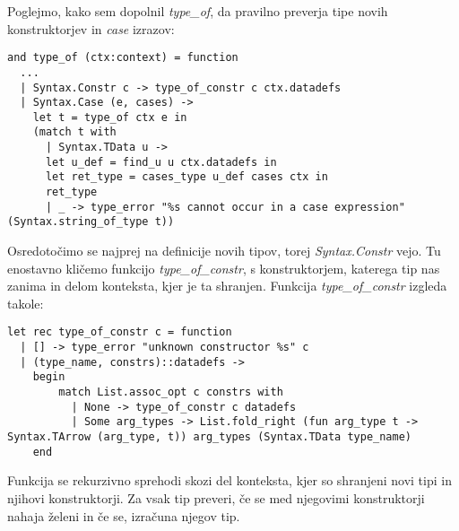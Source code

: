 \documentclass[12pt,a4paper,openany]{book}
\begin{document}
Poglejmo, kako sem dopolnil \emph{type\_of}, da pravilno preverja tipe novih konstruktorjev in \emph{case} izrazov:
\begin{lstlisting}
and type_of (ctx:context) = function
  ...
  | Syntax.Constr c -> type_of_constr c ctx.datadefs
  | Syntax.Case (e, cases) -> 
    let t = type_of ctx e in
    (match t with
      | Syntax.TData u -> 
      let u_def = find_u u ctx.datadefs in
      let ret_type = cases_type u_def cases ctx in
      ret_type
      | _ -> type_error "%s cannot occur in a case expression" (Syntax.string_of_type t))
\end{lstlisting}
Osredotočimo se najprej na definicije novih tipov, torej \emph{Syntax.Constr} vejo. Tu enostavno kličemo funkcijo \emph{type\_of\_constr}, s konstruktorjem, katerega tip nas zanima in delom 
konteksta, kjer je ta shranjen. Funkcija \emph{type\_of\_constr} izgleda takole:
\begin{lstlisting}
let rec type_of_constr c = function
  | [] -> type_error "unknown constructor %s" c
  | (type_name, constrs)::datadefs -> 
    begin
        match List.assoc_opt c constrs with
          | None -> type_of_constr c datadefs
          | Some arg_types -> List.fold_right (fun arg_type t -> Syntax.TArrow (arg_type, t)) arg_types (Syntax.TData type_name) 
    end
\end{lstlisting}
Funkcija se rekurzivno sprehodi skozi del konteksta, kjer so shranjeni novi tipi in njihovi konstruktorji. Za vsak tip preveri, če se med njegovimi konstruktorji nahaja želeni in če se, izračuna 
njegov tip. 
\end{document}
